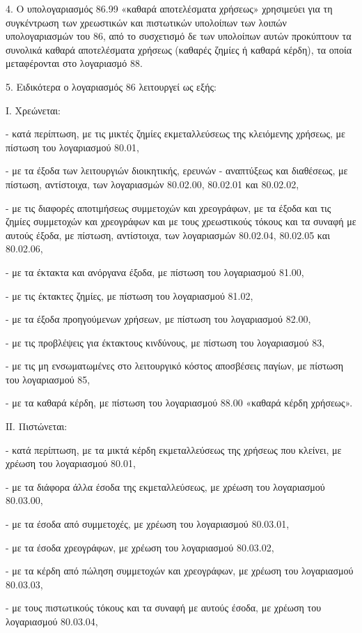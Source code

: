 \documentclass[A4,10pt,greek]{book}
\begin{document}
4. Ο υπολογαριασμός 86.99 «καθαρά αποτελέσματα χρήσεως» χρησιμεύει για τη συγκέντρωση των χρεωστικών και πιστωτικών υπολοίπων των λοιπών υπολογαριασμών του 86, από το συσχετισμό δε των υπολοίπων αυτών προκύπτουν τα συνολικά καθαρά αποτελέσματα χρήσεως (καθαρές ζημίες ή καθαρά κέρδη), τα οποία μεταφέρονται στο λογαριασμό 88.

5. Ειδικότερα ο λογαριασμός 86 λειτουργεί ως εξής:

Ι. Χρεώνεται:

- κατά περίπτωση, με τις μικτές ζημίες εκμεταλλεύσεως της κλειόμενης χρήσεως, με πίστωση του λογαριασμού 80.01,

- με τα έξοδα των λειτουργιών διοικητικής, ερευνών - αναπτύξεως και διαθέσεως, με πίστωση, αντίστοιχα, των λογαριασμών 80.02.00, 80.02.01 και 80.02.02,

- με τις διαφορές αποτιμήσεως συμμετοχών και χρεογράφων, με τα έξοδα και τις ζημίες συμμετοχών και χρεογράφων και με τους χρεωστικούς τόκους και τα συναφή με αυτούς έξοδα, με πίστωση, αντίστοιχα, των λογαριασμών 80.02.04, 80.02.05 και 80.02.06,

- με τα έκτακτα και ανόργανα έξοδα, με πίστωση του λογαριασμού 81.00,

- με τις έκτακτες ζημίες, με πίστωση του λογαριασμού 81.02,

- με τα έξοδα προηγούμενων χρήσεων, με πίστωση του λογαριασμού 82.00,

- με τις προβλέψεις για έκτακτους κινδύνους, με πίστωση του λογαριασμού 83,

- με τις μη ενσωματωμένες στο λειτουργικό κόστος αποσβέσεις παγίων, με πίστωση του λογαριασμού 85,

- με τα καθαρά κέρδη, με πίστωση του λογαριασμού 88.00 «καθαρά κέρδη χρήσεως».

ΙΙ. Πιστώνεται: 

- κατά περίπτωση, με τα μικτά κέρδη εκμεταλλεύσεως της χρήσεως που κλείνει, με χρέωση του λογαριασμού 80.01,

- με τα διάφορα άλλα έσοδα της εκμεταλλεύσεως, με χρέωση του λογαριασμού 80.03.00,

- με τα έσοδα από συμμετοχές, με χρέωση του λογαριασμού 80.03.01,

- με τα έσοδα χρεογράφων, με χρέωση του λογαριασμού 80.03.02,

- με τα κέρδη από πώληση συμμετοχών και χρεογράφων, με χρέωση του λογαριασμού 80.03.03,

- με τους πιστωτικούς τόκους και τα συναφή με αυτούς έσοδα, με χρέωση του λογαριασμού 80.03.04,
\end{document}
